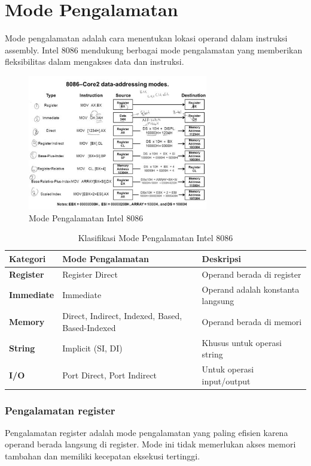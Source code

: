 \documentclass[../main.tex]{subfiles}
\begin{document}
\section{Mode Pengalamatan}
Mode pengalamatan adalah cara menentukan lokasi operand dalam instruksi assembly. Intel 8086 mendukung berbagai mode pengalamatan yang memberikan fleksibilitas dalam mengakses data dan instruksi.

\begin{figure}[h]
\centering
\includegraphics[width=0.7\textwidth]{../images/8086_addressing_modes.jpg}
\caption{Mode Pengalamatan Intel 8086}
\label{fig:8086-addressing-modes}
\end{figure}

\begin{table}[h]
\centering
\caption{Klasifikasi Mode Pengalamatan Intel 8086}
\begin{tabular}{|p{3cm}|p{4cm}|p{8cm}|}
\hline
\textbf{Kategori} & \textbf{Mode Pengalamatan} & \textbf{Deskripsi} \\
\hline
\textbf{Register} & Register Direct & Operand berada di register \\
\hline
\textbf{Immediate} & Immediate & Operand adalah konstanta langsung \\
\hline
\textbf{Memory} & Direct, Indirect, Indexed, Based, Based-Indexed & Operand berada di memori \\
\hline
\textbf{String} & Implicit (SI, DI) & Khusus untuk operasi string \\
\hline
\textbf{I/O} & Port Direct, Port Indirect & Untuk operasi input/output \\
\hline
\end{tabular}
\label{tab:addressing-modes-classification}
\end{table}

\subsubsection{Pengalamatan register}
Pengalamatan register adalah mode pengalamatan yang paling efisien karena operand berada langsung di register. Mode ini tidak memerlukan akses memori tambahan dan memiliki kecepatan eksekusi tertinggi.
\end{document}
